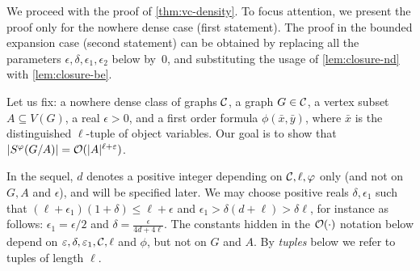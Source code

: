 We proceed with the proof of \cref{thm:vc-density}.
 To focus attention, we present the proof only for the nowhere dense case (first statement). The proof in the bounded expansion case (second statement)
 can be obtained by replacing all the parameters $\epsilon,\delta,\epsilon_1,\epsilon_2$ below by~$0$, and substituting the usage of \cref{lem:closure-nd} with \cref{lem:closure-be}.

 Let us fix: a nowhere dense class of graphs $\CCC$, a graph $G\in \CCC$, a vertex subset $A\subseteq V(G)$, a real $\epsilon>0$, and 
 a first order formula $\phi(\bar x,\bar y)$, where $\bar x$ is the distinguished $\ell$-tuple of object variables.
 Our goal is to show that $|S^\phi(G/A)|=\Oof(|A|^{\ell+\epsilon})$.
 	   
In the sequel, $d$ denotes a positive integer 
depending on ${\cal C},\ell,\phi$ only (and not on $G, A$ and $\epsilon$), and will be specified later. We may choose positive reals
$\delta,\epsilon_1$ such that 
	 $(\ell+\epsilon_1)(1+\delta) 
	 \le
	 \ell+\epsilon$ and $\epsilon_1>\delta(d+\ell)> \delta\ell$, for instance as follows: $\epsilon_1=\epsilon/2$ and $\delta=\frac{\epsilon}{4d+4\ell}$.
The constants hidden in the $\Oof(\cdot)$ notation below depend
 on $\epsilon,\delta,\epsilon_1,\cal C, \ell$ and $\phi$, but not on $G$ and $A$.   By \emph{tuples} below we refer to tuples of length $\ell$.

